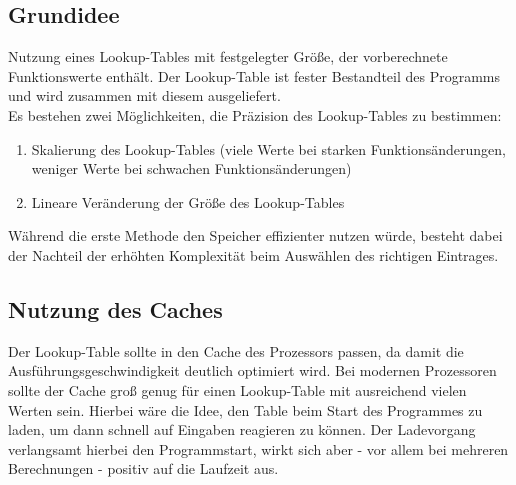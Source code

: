 \documentclass{article}
\begin{document}
	\subsection{Grundidee}
		Nutzung eines Lookup-Tables mit festgelegter Größe, der vorberechnete Funktionswerte enthält. Der Lookup-Table ist fester Bestandteil des Programms und wird zusammen mit diesem ausgeliefert.\\
		Es bestehen zwei Möglichkeiten, die Präzision des Lookup-Tables zu bestimmen:\\
		\begin{enumerate}
			\item Skalierung des Lookup-Tables (viele Werte bei starken Funktionsänderungen, weniger Werte bei schwachen Funktionsänderungen)
			\item Lineare Veränderung der Größe des Lookup-Tables
		\end{enumerate}
		Während die erste Methode den Speicher effizienter nutzen würde, besteht dabei der Nachteil der erhöhten Komplexität beim Auswählen des richtigen Eintrages.

	\subsection{Nutzung des Caches}
		\label{sec:CacheUsage}
		Der Lookup-Table sollte in den Cache des Prozessors passen, da damit die Ausführungsgeschwindigkeit deutlich optimiert wird. Bei modernen Prozessoren sollte der Cache groß genug für einen Lookup-Table mit ausreichend vielen Werten sein. Hierbei wäre die Idee, den Table beim Start des Programmes zu laden, um dann schnell auf Eingaben reagieren zu können. Der Ladevorgang verlangsamt hierbei den Programmstart, wirkt sich aber - vor allem bei mehreren Berechnungen - positiv auf die Laufzeit aus.
\end{document}
